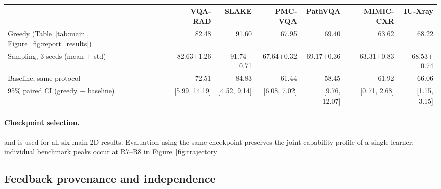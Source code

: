 \begin{table}[!htbp]
\centering\scriptsize\color{blue}
\revtablenumber
\caption{}
\label{tab:ci}
\setlength{\tabcolsep}{3pt}
\renewcommand{\arraystretch}{1.18}
\begin{tabularx}{\linewidth}{@{}Yrrrrrr@{}}
\toprule
 & VQA-RAD & SLAKE & PMC-VQA & PathVQA & MIMIC-CXR & IU-Xray\\
\midrule
Greedy (Table~\ref{tab:main}, Figure~\ref{fig:report_results}) & 82.48 & 91.60 & 67.95 & 69.40 & 63.62 & 68.22\\
Sampling, 3 seeds (mean $\pm$ std) & 82.63$\pm$1.26 & 91.74$\pm$0.71 & 67.64$\pm$0.32 & 69.17$\pm$0.36 & 63.31$\pm$0.83 & 68.53$\pm$0.74\\
Baseline, same protocol & 72.51 & 84.83 & 61.44 & 58.45 & 61.92 & 66.06\\
95\% paired CI (greedy $-$ baseline) & [5.99, 14.19] & [4.52, 9.14] & [6.08, 7.02] & [9.76, 12.07] & [0.71, 2.68] & [1.15, 3.15]\\
\bottomrule
\end{tabularx}
\end{table}

\paragraph{Checkpoint selection.}
\label{app:checkpoint_selection}
 and is used for all six main 2D results. Evaluation using the same checkpoint preserves the joint capability profile of a single learner; individual benchmark peaks occur at R7--R8 in Figure~\ref{fig:trajectory}.



\subsection{Feedback provenance and independence}

